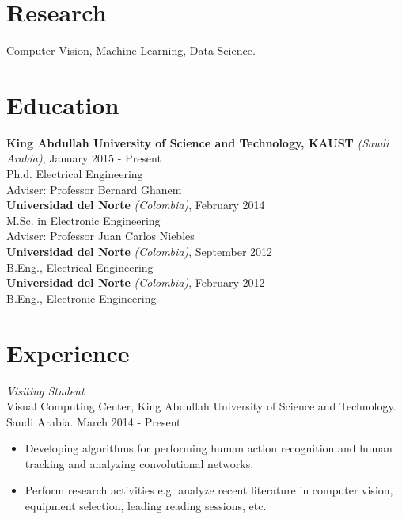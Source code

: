 \documentclass[margin]{res}
\begin{document}
 
 
 
\address{{\bf Present Address} \\ Al Khawarizmi Building (Bldg 1), 2106-WS06
          \\ Thuwal 23955-6900, Kingdom of Saudi Arabia}
\address{{\bf Contact} \\ escorciav@gmail.com - victor.escorcia@kaust.edu.sa}
 
\begin{resume} 
 
\section{Research} 
Computer Vision, Machine Learning, Data Science.


\section{Education}
\textbf{King Abdullah University of Science and Technology, KAUST}
\textit{(Saudi Arabia)}, January 2015 - Present \\
Ph.d. Electrical Engineering\\
\bigskip Adviser: Professor Bernard Ghanem\\
\textbf{Universidad del Norte} \textit{(Colombia)}, February 2014 \\
M.Sc. in Electronic Engineering\\
\bigskip Adviser: Professor Juan Carlos Niebles\\
\textbf{Universidad del Norte} \textit{(Colombia)}, September 2012 \\
B.Eng., Electrical Engineering\\
\textbf{Universidad del Norte} \textit{(Colombia)}, February 2012 \\
B.Eng., Electronic Engineering\\
 

\section{Experience}
 \textit{Visiting Student}\\
 Visual Computing Center, King Abdullah University of Science and Technology.
 Saudi Arabia. \hfill March 2014 - Present \\
 \begin{itemize} \itemsep -2pt %
 \item Developing algorithms for performing human action recognition and human
       tracking and analyzing convolutional networks.
 \item Perform research activities e.g. analyze recent literature in computer
       vision, equipment selection, leading reading sessions, etc.
 \end{itemize}
 

\end{resume}
\end{document}
